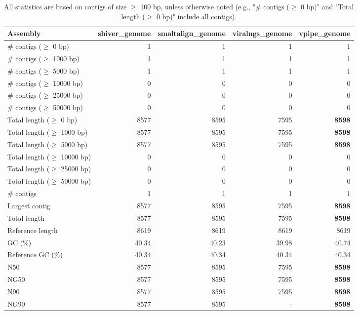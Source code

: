 \documentclass[12pt,a4paper]{article}
\begin{document}
\begin{table}[ht]
\begin{center}
\caption{All statistics are based on contigs of size $\geq$ 100 bp, unless otherwise noted (e.g., "\# contigs ($\geq$ 0 bp)" and "Total length ($\geq$ 0 bp)" include all contigs).}
\begin{tabular}{|l*{4}{|r}|}
\hline
Assembly & shiver\_genome & smaltalign\_genome & viralngs\_genome & vpipe\_genome \\ \hline
\# contigs ($\geq$ 0 bp) & 1 & 1 & 1 & 1 \\ \hline
\# contigs ($\geq$ 1000 bp) & 1 & 1 & 1 & 1 \\ \hline
\# contigs ($\geq$ 5000 bp) & 1 & 1 & 1 & 1 \\ \hline
\# contigs ($\geq$ 10000 bp) & 0 & 0 & 0 & 0 \\ \hline
\# contigs ($\geq$ 25000 bp) & 0 & 0 & 0 & 0 \\ \hline
\# contigs ($\geq$ 50000 bp) & 0 & 0 & 0 & 0 \\ \hline
Total length ($\geq$ 0 bp) & 8577 & 8595 & 7595 & {\bf 8598} \\ \hline
Total length ($\geq$ 1000 bp) & 8577 & 8595 & 7595 & {\bf 8598} \\ \hline
Total length ($\geq$ 5000 bp) & 8577 & 8595 & 7595 & {\bf 8598} \\ \hline
Total length ($\geq$ 10000 bp) & 0 & 0 & 0 & 0 \\ \hline
Total length ($\geq$ 25000 bp) & 0 & 0 & 0 & 0 \\ \hline
Total length ($\geq$ 50000 bp) & 0 & 0 & 0 & 0 \\ \hline
\# contigs & 1 & 1 & 1 & 1 \\ \hline
Largest contig & 8577 & 8595 & 7595 & {\bf 8598} \\ \hline
Total length & 8577 & 8595 & 7595 & {\bf 8598} \\ \hline
Reference length & 8619 & 8619 & 8619 & 8619 \\ \hline
GC (\%) & 40.34 & 40.23 & 39.98 & 40.74 \\ \hline
Reference GC (\%) & 40.34 & 40.34 & 40.34 & 40.34 \\ \hline
N50 & 8577 & 8595 & 7595 & {\bf 8598} \\ \hline
NG50 & 8577 & 8595 & 7595 & {\bf 8598} \\ \hline
N90 & 8577 & 8595 & 7595 & {\bf 8598} \\ \hline
NG90 & 8577 & 8595 & - & {\bf 8598} \\ \hline

\end{tabular}
\end{center}
\end{table}
\end{document}
